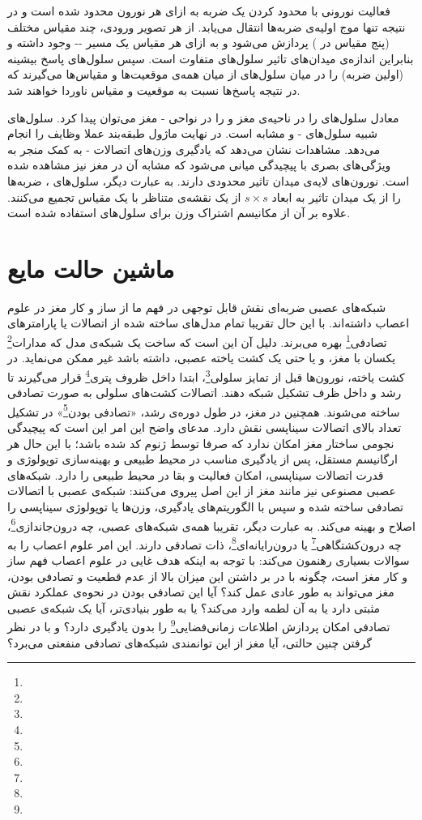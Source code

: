 فعالیت نورونی با محدود کردن یک ضربه به ازای هر نورون محدود شده است و در نتیجه تنها موج اولیه‌ی ضربه‌ها انتقال می‌یابد. از هر تصویر ورودی، چند مقیاس مختلف (پنج مقیاس در \cite{masquelier2007unsupervised}) پردازش می‌شود و به ازای هر مقیاس یک مسیر -- وجود داشته و بنابراین اندازه‌ی میدان‌های تاثیر سلول‌های  متفاوت است. سپس سلول‌های  پاسخ بیشینه (اولین ضربه) را در میان سلول‌های  از میان همه‌ی موقعیت‌ها و مقیاس‌ها می‌گیرند که در نتیجه پاسخ‌ها نسبت به موقعیت و مقیاس ناوردا خواهند شد.

معادل سلول‌های  را در ناحیه‌ی  مغز و را در نواحی - مغز می‌توان پیدا کرد. سلول‌های  شبیه سلول‌های - و  مشابه  است. در نهایت ماژول طبقه‌بند عملا وظایف  را انجام می‌دهد. مشاهدات نشان می‌دهد که یادگیری وزن‌های اتصالات - به کمک  منجر به ویژگی‌های بصری با پیچیدگی میانی می‌شود که مشابه آن در مغز نیز مشاهده شده است. نورون‌های لایه‌ی  میدان تاثیر محدودی دارند. به عبارت دیگر، سلول‌های ، ضربه‌ها را از یک میدان تاثیر به ابعاد $s \times s$ از یک نقشه‌ی  متناظر با یک مقیاس تجمیع می‌کنند. علاوه بر آن از مکانیسم اشتراک وزن برای سلول‌های  استفاده شده است. 

\section{ماشین حالت مایع}
شبکه‌های عصبی ضربه‌ای نقش قابل توجهی در فهم ما از ساز و کار مغز در علوم اعصاب داشته‌اند. با این حال تقریبا تمام مدل‌های ساخته شده از اتصالات یا پارامتر‌های تصادفی\footnote{} بهره می‌برند. دلیل آن این است که ساخت یک شبکه‌ی مدل که مدارات\footnote{} یکسان با مغز، و یا حتی یک کشت یاخته عصبی، داشته باشد غیر ممکن می‌نماید. در کشت یاخته، نورون‌ها قبل از تمایز سلولی\footnote{}، ابتدا داخل ظروف پتری\footnote{} قرار می‌گیرند تا رشد و داخل ظرف تشکیل شبکه دهند. اتصالات کشت‌های سلولی به صورت تصادفی ساخته می‌شوند. همچنین در مغز، در طول دوره‌ی رشد، «تصادفی بودن\footnote{}» در تشکیل تعداد بالای اتصالات سیناپسی نقش دارد. مدعای واضح این امر این است که پیچیدگی نجومی ساختار مغز امکان ندارد که صرفا توسط ژنوم کد شده باشد؛ با این حال هر ارگانیسم مستقل، پس از یادگیری مناسب در محیط طبیعی و بهینه‌سازی توپولوژی و قدرت اتصالات سیناپسی، امکان فعالیت و بقا در محیط طبیعی را دارد. شبکه‌های عصبی مصنوعی نیز مانند مغز از این اصل پیروی می‌کنند: شبکه‌ی عصبی با اتصالات تصادفی ساخته شده و سپس با الگوریتم‌های یادگیری، وزن‌ها یا توپولوژی سیناپسی را اصلاح و بهینه می‌کند. به عبارت دیگر، تقریبا همه‌ی شبکه‌های عصبی، چه درون‌جاندازی\footnote{}، چه درون‌کشتگاهی\footnote{} یا درون‌رایانه‌ای\footnote{}، ذات تصادفی دارند. این امر علوم اعصاب را به سوالات بسیاری رهنمون می‌کند: با توجه به اینکه هدف غایی در علوم اعصاب فهم ساز و کار مغز است، چگونه با در بر داشتن این میزان بالا از عدم قطعیت و تصادفی بودن، مغز می‌تواند به طور عادی عمل کند؟ آیا این تصادفی بودن در نحوه‌ی عملکرد نقش مثبتی دارد یا به آن لطمه وارد می‌کند؟ یا به طور بنیادی‌تر، آیا یک شبکه‌ی عصبی تصادفی امکان پردازش اطلاعات زمانی‌فضایی\footnote{} را بدون یادگیری دارد؟ و با در نظر گرفتن چنین حالتی، آیا مغز از این توانمندی شبکه‌های تصادفی منفعتی می‌برد؟ 

